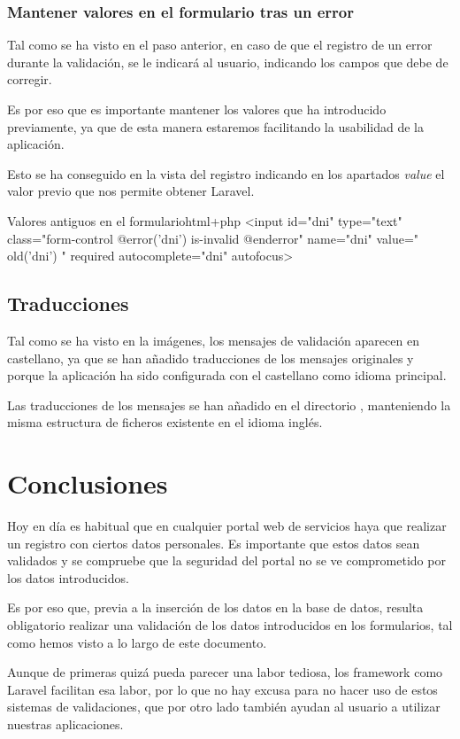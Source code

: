\documentclass{\ClassPath/viu-tfm-template}
\begin{document}
\subsection{Mantener valores en el formulario tras un error}
Tal como se ha visto en el paso anterior, en caso de que el registro de un error durante la validación, se le indicará al usuario, indicando los campos que debe de corregir.

Es por eso que es importante mantener los valores que ha introducido previamente, ya que de esta manera estaremos facilitando la usabilidad de la aplicación.

Esto se ha conseguido en la vista del registro indicando en los apartados \textit{value} el valor previo que nos permite obtener Laravel.


\begin{mycode}{Valores antiguos en el formulario}{html+php}{}
<input id="dni" type="text" class="form-control
    @error('dni') is-invalid @enderror" name="dni"
    value="{{ old('dni') }}"
    required autocomplete="dni" autofocus>
\end{mycode}


\section{Traducciones}
Tal como se ha visto en la imágenes, los mensajes de validación aparecen en castellano, ya que se han añadido traducciones de los mensajes originales y porque la aplicación ha sido configurada con el castellano como idioma principal.

Las traducciones de los mensajes se han añadido en el directorio , manteniendo la misma estructura de ficheros existente en el idioma inglés.



\chapter{Conclusiones}
Hoy en día es habitual que en cualquier portal web de servicios haya que realizar un registro con ciertos datos personales. Es importante que estos datos sean validados y se compruebe que la seguridad del portal no se ve comprometido por los datos introducidos.

Es por eso que, previa a la inserción de los datos en la base de datos, resulta obligatorio realizar una validación de los datos introducidos en los formularios, tal como hemos visto a lo largo de este documento.

Aunque de primeras quizá pueda parecer una labor tediosa, los framework como Laravel facilitan esa labor, por lo que no hay excusa para no hacer uso de estos sistemas de validaciones, que por otro lado también ayudan al usuario a utilizar nuestras aplicaciones.
\end{document}
